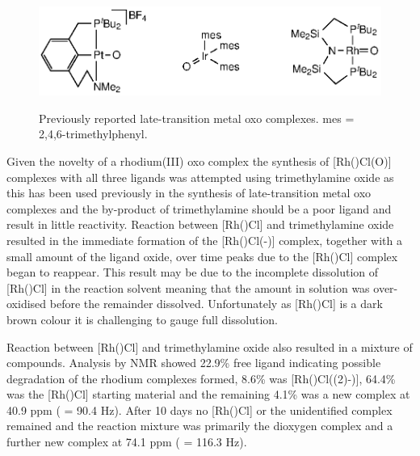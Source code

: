 \begin{figure}[htb]
\begin{center}
\vspace{0.5cm}
\includegraphics{../Figures/Rhodiumotheroxo.eps}
\caption[Previously reported late-transition metal oxo complexes]{Previously reported late-transition metal oxo complexes. mes = 2,4,6-trimethylphenyl.}
\vspace{0.2cm}
\label{Rhodiumotheroxo}
\end{center}
\end{figure}
\vspace{0.2cm}

Given the novelty of a rhodium(III) oxo complex the synthesis of [Rh(\tBuxantphos)Cl(O)] complexes with all three \tBuxantphos{} ligands was attempted using trimethylamine oxide as this has been used previously in the synthesis of late-transition metal oxo complexes\cite{Motherwell1993, Tsvetkov2013} and the by-product of trimethylamine should be a poor ligand and result in little reactivity.    Reaction between [Rh(\tBusixantphos)Cl] and trimethylamine oxide resulted in the immediate formation of the [Rh(\tBusixantphos)Cl(\hapto{}-)] complex, together with a small amount of the ligand oxide, over time peaks due to the [Rh(\tBusixantphos)Cl] complex began to reappear.  This result may be due to the incomplete dissolution of [Rh(\tBusixantphos)Cl] in the  reaction solvent meaning that the amount in solution was over-oxidised before the remainder dissolved.  Unfortunately as [Rh(\tBusixantphosk)Cl] is a dark brown colour it is challenging to gauge full dissolution.  

Reaction between [Rh(\tButhixantphosk)Cl] and trimethylamine oxide also resulted in a mixture of compounds.  Analysis by \phosphorus{} NMR showed 22.9\%{} free \tButhixantphos{} ligand indicating possible degradation of the rhodium complexes formed, 8.6\%{} was [Rh(\tBusixantphos)Cl(\hapto(2)-)], 64.4\% was the [Rh(\tButhixantphos)Cl] starting material and the remaining 4.1\% was a new complex at 40.9 ppm (\JRhP{} = 90.4 Hz).  After 10 days no [Rh(\tButhixantphos)Cl] or the unidentified complex remained and the reaction mixture was primarily the dioxygen complex and a further new complex at 74.1 ppm (\JRhP{} = 116.3 Hz).  

